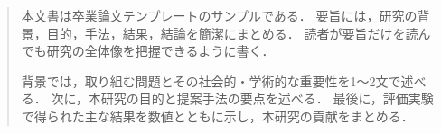\documentclass[main]{subfiles}
\begin{document}
\begin{abstract}%
本文書は卒業論文テンプレートのサンプルである．
要旨には，研究の背景，目的，手法，結果，結論を簡潔にまとめる．
読者が要旨だけを読んでも研究の全体像を把握できるように書く．\par
背景では，取り組む問題とその社会的・学術的な重要性を1〜2文で述べる．
次に，本研究の目的と提案手法の要点を述べる．
最後に，評価実験で得られた主な結果を数値とともに示し，本研究の貢献をまとめる．
\end{abstract}
\end{document}
